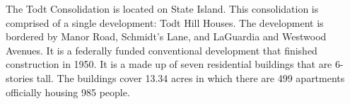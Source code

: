 The Todt Consolidation is located on State Island. This consolidation is comprised of a single development: Todt Hill Houses. The development is bordered by Manor Road, Schmidt's Lane, and LaGuardia and Westwood Avenues. It is a federally funded conventional development that finished construction in 1950. It is a made up of seven residential buildings that are 6- stories tall. The buildings cover 13.34 acres in which there are 499 apartments officially housing 985 people.